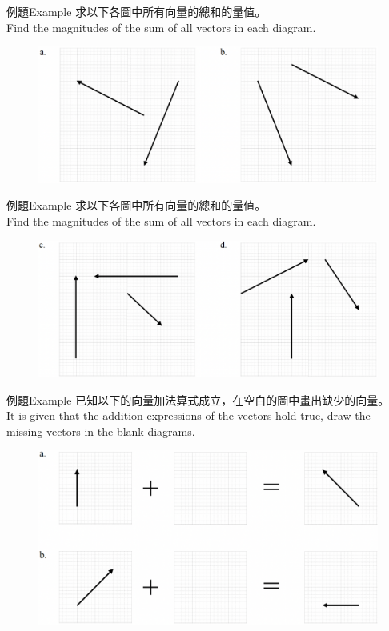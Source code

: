 \documentclass[beamer=true]{standalone}
\begin{document}
\begin{frame}{例題Example}
    求以下各圖中所有向量的總和的量值。\\Find the magnitudes of the sum of all vectors in each diagram.
    \begin{figure}[h!]
        \centering
        \includegraphics[width=\textwidth]{../../assets/b3abd67b.png}
    \end{figure}
\end{frame}
\begin{frame}{例題Example}
    求以下各圖中所有向量的總和的量值。\\Find the magnitudes of the sum of all vectors in each diagram.
    \begin{figure}[h!]
        \centering
        \includegraphics[width=\textwidth]{../../assets/2d454bed.png}
    \end{figure}
\end{frame}
\begin{frame}{例題Example}
    已知以下的向量加法算式成立，在空白的圖中畫出缺少的向量。 \\It is given that the addition expressions of the vectors hold true, draw the missing vectors in the blank diagrams.
    \begin{figure}[h!]
        \centering
        \includegraphics[width=\textwidth]{../../assets/02f3ce52.png}
    \end{figure}
\end{frame}
\end{document}
